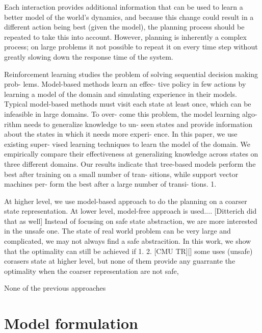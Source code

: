 \documentclass{article} %
\begin{document}
Each interaction provides additional
information that can be used to learn a better model of the
world’s dynamics, and because this change could result in a
different action being best (given the model), the planning
process should be repeated to take this into account. However,
planning is inherently a complex process; on large
problems it not possible to repeat it on every time step without
greatly slowing down the response time of the system.


Reinforcement learning studies the problem
of solving sequential decision making prob-
lems. Model-based methods learn an effec-
tive policy in few actions by learning a model
of the domain and simulating experience in
their models. Typical model-based methods
must visit each state at least once, which
can be infeasible in large domains. To over-
come this problem, the model learning algo-
rithm needs to generalize knowledge to un-
seen states and provide information about
the states in which it needs more experi-
ence. In this paper, we use existing super-
vised learning techniques to learn the model
of the domain. We empirically compare their
effectiveness at generalizing knowledge across
states on three different domains. Our results
indicate that tree-based models perform the
best after training on a small number of tran-
sitions, while support vector machines per-
form the best after a large number of transi-
tions.
1.




At higher level, we use model-based approach to do the planning on a coarser state representation. 
At lower level, model-free approach is used....
[Ditterich did that as well]
Instead of focusing on safe state abstraction, we are more interested in the unsafe one.
The state of real world problem can be very large and complicated, we may 
not always find a safe abstracition. In this work, we show that the 
optimality can still be achieved if 1. 2. 
[CMU TR][] some uses (unsafe) corasers state at higher level, but none of them 
provide any guarrante the optimality when the coarser representation are
not safe, 

None of the previous approaches 

\section{Model formulation}
\end{document}
